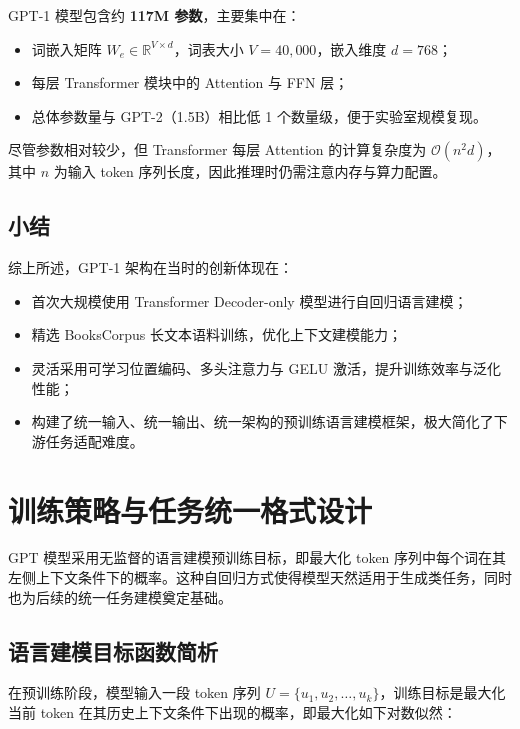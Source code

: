 \documentclass[a4paper,12pt]{article}
\begin{document}
GPT-1 模型包含约 \textbf{117M 参数}，主要集中在：

\begin{itemize}
    \item 词嵌入矩阵 $W_e \in \mathbb{R}^{V \times d}$，词表大小 $V = 40,000$，嵌入维度 $d=768$；
    \item 每层 Transformer 模块中的 Attention 与 FFN 层；
    \item 总体参数量与 GPT-2（1.5B）相比低 1 个数量级，便于实验室规模复现。
\end{itemize}

尽管参数相对较少，但 Transformer 每层 Attention 的计算复杂度为 $\mathcal{O}(n^2 d)$，其中 $n$ 为输入 token 序列长度，因此推理时仍需注意内存与算力配置。

\subsection{小结}

综上所述，GPT-1 架构在当时的创新体现在：

\begin{itemize}
    \item 首次大规模使用 Transformer Decoder-only 模型进行自回归语言建模；
    \item 精选 BooksCorpus 长文本语料训练，优化上下文建模能力；
    \item 灵活采用可学习位置编码、多头注意力与 GELU 激活，提升训练效率与泛化性能；
    \item 构建了统一输入、统一输出、统一架构的预训练语言建模框架，极大简化了下游任务适配难度。
\end{itemize}


\section{训练策略与任务统一格式设计}

GPT 模型采用无监督的语言建模预训练目标，即最大化 token 序列中每个词在其左侧上下文条件下的概率。这种自回归方式使得模型天然适用于生成类任务，同时也为后续的统一任务建模奠定基础。

\subsection{语言建模目标函数简析}

在预训练阶段，模型输入一段 token 序列 $U = \{u_1, u_2, \dots, u_k\}$，训练目标是最大化当前 token 在其历史上下文条件下出现的概率，即最大化如下对数似然：
\end{document}
